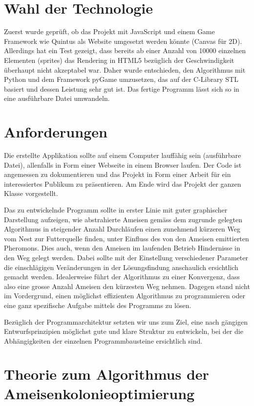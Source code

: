 \section{Wahl der Technologie}

Zuerst wurde geprüft, ob das Projekt mit JavaScript und einem Game Framework wie
Quintus als Website umgesetzt werden könnte (Canvas für 2D). Allerdings hat ein
Test gezeigt, dass bereits ab einer Anzahl von \num{10000} einzelnen Elementen
(sprites) das Rendering in HTML5 bezüglich der Geschwindigkeit überhaupt nicht
akzeptabel war. Daher wurde entschieden, den Algorithmus mit Python und dem
Framework pyGame umzusetzen, das auf der C-Library STL basiert und dessen
Leistung sehr gut ist. Das fertige Programm lässt sich so in eine ausführbare
Datei umwandeln.

\section{Anforderungen}

Die erstellte Applikation sollte auf einem Computer lauffähig sein (ausführbare
Datei), allenfalls in Form einer Webseite in einem Browser laufen. Der Code ist
angemessen zu dokumentieren und das Projekt in Form einer Arbeit für ein
interessiertes Publikum zu präsentieren. Am Ende wird das Projekt der ganzen
Klasse vorgestellt.

Das zu entwickelnde Programm sollte in erster Linie mit guter graphischer
Darstellung aufzeigen, wie abstrahierte Ameisen gemäss dem zugrunde gelegten
Algorithmus in steigender Anzahl Durchläufen einen zunehmend kürzeren Weg vom
Nest zur Futterquelle finden, unter Einfluss des von den Ameisen emittierten
Pheromons. Dies auch, wenn den Ameisen im laufenden Betrieb Hindernisse in den
Weg gelegt werden. Dabei sollte mit der Einstellung verschiedener Parameter die
einschlägigen Veränderungen in der Lösungsfindung anschaulich ersichtlich gemacht
werden. Idealerweise führt der Algorithmus zu einer Konvergenz, dass also eine
grosse Anzahl Ameisen den kürzesten Weg nehmen. Dagegen stand nicht im
Vordergrund, einen möglichst effizienten Algorithmus zu programmieren oder eine
ganz spezifische Aufgabe mittels des Programms zu lösen.

Bezüglich der Programmarchitektur setzten wir uns zum Ziel, eine nach gängigen
Entwurfsprinzipien möglichst gute und klare Struktur zu entwickeln, bei der die
Abhängigkeiten der einzelnen Programmbausteine ersichtlich sind.

\section{Theorie zum Algorithmus der Ameisenkolonieoptimierung}

